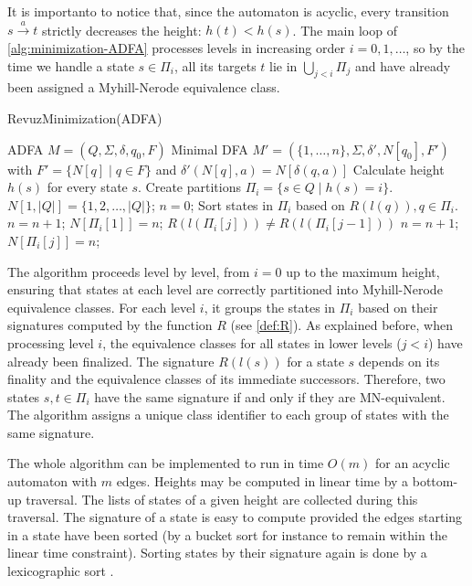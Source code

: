 It is importanto to notice that, since the automaton is acyclic, every transition $s \xrightarrow{a} t$ strictly decreases the height: $h(t) < h(s)$. The main loop of \cref{alg:minimization-ADFA} processes levels in increasing order $i=0,1,\dots$, so by the time we handle a state $s\in\Pi_i$, all its targets $t$ lie in $\bigcup_{j<i}\Pi_j$ and have already been assigned a Myhill-Nerode equivalence class.

\begin{algorithm}[H]
    \caption{RevuzMinimization(ADFA)}
    \label{alg:minimization-ADFA}
    \begin{algorithmic}[1]
    \Require ADFA $M=(Q,\Sigma,\delta,q_0,F)$
    \Ensure Minimal DFA $M'=(\{1,\dots,n\},\Sigma,\delta',N[q_0],F')$ with $F'=\{N[q]\mid q\in F\}$ and $\delta'(N[q],a)=N[\delta(q,a)]$
    \State Calculate height $h(s)$ for every state $s$.
    \State Create partitions $\Pi_i = \{s \in Q \mid h(s) = i\}$.
    \State $N[1, |Q|] = \{1,2,\dots,|Q|\}$; 
    \State $n = 0$; 
     
        \State Sort states in $\Pi_i$ based on $R(l(q)), q\in \Pi_i$.
        \State $n = n + 1$;
        \State $N[\Pi_i[1]] = n$;
            \If $R(l(\Pi_i[j])) \ne R(l(\Pi_i[j-1]))$
                \State $n = n + 1$;
            \EndIf
            \State $N[\Pi_i[j]] = n$;
        \EndFor
    \EndFor
    \end{algorithmic}
\end{algorithm}

The algorithm proceeds level by level, from $i=0$ up to the maximum height, ensuring that states at each level are correctly partitioned into Myhill-Nerode equivalence classes. For each level $i$, it groups the states in $\Pi_i$ based on their signatures computed by the function $R$ (see \cref{def:R}). As explained before, when processing level $i$, the equivalence classes for all states in lower levels ($j < i$) have already been finalized. The signature $R(l(s))$ for a state $s$ depends on its finality and the equivalence classes of its immediate successors. Therefore, two states $s, t \in \Pi_i$ have the same signature if and only if they are MN-equivalent. The algorithm assigns a unique class identifier to each group of states with the same signature.

The whole algorithm can be implemented to run in time $O(m)$ for an acyclic automaton with $m$ edges. Heights may be computed in linear time by
a bottom-up traversal. The lists of states of a given height are collected during this traversal. The signature of a state is easy to compute provided the edges starting in a state have
been sorted (by a bucket sort for instance to remain within the linear time constraint).
Sorting states by their signature again is done by a lexicographic sort \cite{berstel2010minimization}. 

